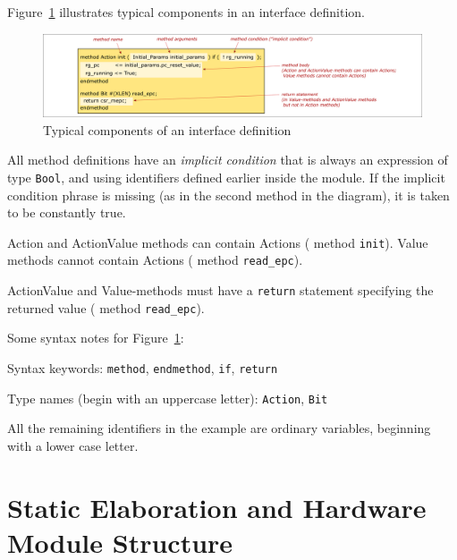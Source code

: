 Figure~\ref{Fig_BSV_whats_in_an_interface_def} illustrates typical
components in an interface definition.
\begin{figure}[htbp]
  \centerline{\includegraphics[width=6in,angle=0]{Figures/Fig_BSV_whats_in_an_interface_def}}
  \caption{\label{Fig_BSV_whats_in_an_interface_def}
           Typical components of an interface definition}
\end{figure}
All method definitions have an \emph{implicit condition} that is
always an expression of type \verb|Bool|, and using identifiers
defined earlier inside the module.  If the implicit condition phrase
is missing (as in the second method in the diagram), it is taken to be
constantly true.

Action and ActionValue methods can contain Actions ({\eg} method
\verb|init|).  Value methods cannot contain Actions ({\eg} method
\verb|read_epc|).

ActionValue and Value-methods must have a \verb|return| statement
specifying the returned value ({\eg} method \verb|read_epc|).

Some syntax notes for Figure~\ref{Fig_BSV_whats_in_an_interface_def}:

\begin{tightlist}

 \item Syntax keywords: \verb|method|, \verb|endmethod|, \verb|if|, \verb|return|

 \item Type names (begin with an uppercase letter): \verb|Action|, \verb|Bit|

 \item All the remaining identifiers in the example are ordinary
       variables, beginning with a lower case letter.

\end{tightlist}


\section{Static Elaboration and Hardware Module Structure}

